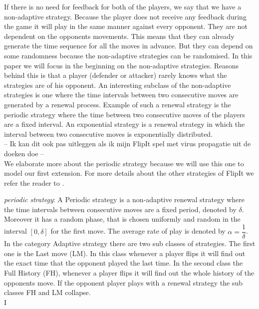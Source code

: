 If there is no need for feedback for both of the players, we say that we have a non-adaptive strategy. Because the player does not receive any feedback during the game it will play in the same manner against every opponent. They are not dependent on the opponents movements. This means that they can already generate the time sequence for all the moves in advance.  But they can depend on some randomness because the non-adaptive strategies can be randomised. 
In this paper we will focus in the beginning on the non-adaptive strategies. Reasons behind this is that a player (defender or attacker) rarely knows what the strategies are of his opponent. An interesting subclass of the non-adaptive strategies is one where the time intervals between two consecutive moves are generated by a renewal process. Example of such a renewal strategy is the periodic strategy where the time between two consecutive moves of the players are a fixed interval. An exponential strategy is a renewal strategy in which the interval between two consecutive moves is exponentially distributed.  \\

-- Ik kan dit ook pas uitleggen als ik mijn FlipIt spel met virus propagatie uit de doeken doe -- \\
We elaborate more about the periodic strategy because we will use this one to model our first extension. For more details about the other strategies of FlipIt we refer the reader to \citep{FlipIt}.

\textit{periodic strategy}: A Periodic strategy is a non-adaptive renewal strategy where the time intervals between consecutive moves are a fixed period, denoted by $\delta$. Moreover it has a random phase, that is chosen uniformly and random in the interval $[0,\delta]$ for the first move. The average rate of play is denoted by $\alpha = \dfrac{1}{\delta}$. \\

In the category Adaptive strategy there are two sub classes of strategies. The first one is the Last move (LM). In this class whenever a player flips it will find out the exact time that the opponent played the last time. In the second class the Full History (FH), whenever a player flips it will find out the whole history of the opponents move. If the opponent player plays with a renewal strategy the sub classes FH and LM collapse. \\
 I%


